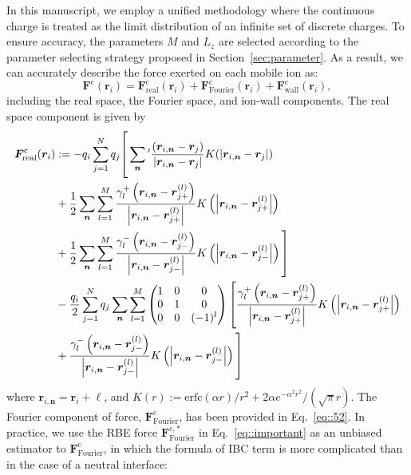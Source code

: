 In this manuscript, we employ a unified methodology where the continuous charge is treated as the limit distribution of an infinite set of discrete charges.
To ensure accuracy, the parameters $M$ and $L_z$ are selected according to the parameter selecting strategy proposed in Section~\ref{sec:parameter}.
As a result, we can accurately describe the force exerted on each mobile ion as:
\begin{equation}
\bm{F}^{\text{c}}(\bm{r}_i)=\bm{F}^{\text{c}}_{\text{real}}(\bm{r}_i)+\bm{F}^{\text{c}}_{\text{Fourier}}(\bm{r}_i)+\bm{F}^{\text{c}}_{\text{wall}}(\bm{r}_i),
\end{equation}
including the real space, the Fourier space, and ion-wall components. The real space component is given by
\begin{equation}\label{eq::F_real_detail}
\begin{split}
\bm{F}_{\text{real}}^{\te{c}}(\bm{r}_i)
& := -q_i\sum_{j=1}^{N} q_j \Biggg[\sum_{\bm{n}}{}^\prime \frac{\left(\bm{r}_{i,\bm{n}} - \bm{r}_{j}\right)}{\abs{\bm{r}_{i,\bm{n}} - \bm{r}_{j}}} K(\abs{\bm{r}_{i,\bm{n}} - \bm{r}_{j}}) \\
&+ \frac{1}{2} \sum_{\bm{n}} \sum_{l=1}^{M} \frac{\gamma_{l}^+\left(\bm{r}_{i,\bm{n}}-\bm{r}_{j+}^{(l)}\right)}{\left|\bm{r}_{i,\bm{n}}-\bm{r}_{j+}^{(l)}\right|} K\left(\left|\bm{r}_{i,\bm{n}}-\bm{r}_{j+}^{(l)}\right|\right)\\
&+\frac{1}{2}\sum_{\bm{n}}\sum_{l=1}^{M}\frac{\gamma_{l}^-\left(\bm{r}_{i,\bm{n}}-\bm{r}_{j-}^{(l)}\right)}{\left|\bm{r}_{i,\bm{n}}-\bm{r}_{j-}^{(l)}\right|}K\left(\left|\bm{r}_{i,\bm{n}}-\bm{r}_{j-}^{(l)}\right|\right)\Biggg]\\
&-\frac{q_i}{2}\sum_{j=1}^{N}q_j\sum_{\bm{n}}\sum_{l=1}^{M}\begin{pmatrix}
1&0&0\\
0&1&0\\
0&0&(-1)^l
\end{pmatrix}\Biggg[
\frac{\gamma_{l}^+\left(\bm{r}_{i,\bm{n}}-\bm{r}_{j+}^{(l)}\right)}{\left|\bm{r}_{i,\bm{n}}-\bm{r}_{j+}^{(l)}\right|}K\left(\left|\bm{r}_{i,\bm{n}}-\bm{r}_{j+}^{(l)}\right|\right)\\
&+\frac{\gamma_{l}^-\left(\bm{r}_{i,\bm{n}}-\bm{r}_{j-}^{(l)}\right)}{\left|\bm{r}_{i,\bm{n}}-\bm{r}_{j-}^{(l)}\right|}K\left(\left|\bm{r}_{i,\bm{n}}-\bm{r}_{j-}^{(l)}\right|\right)\Biggg]
\end{split}
\end{equation}
where $\bm{r}_{i,\bm{n}}=\bm{r}_{i}+\bm{\ell}$, and $K(r):=\text{erfc}(\alpha r)/r^2+2\alpha e^{-\alpha^2r^2}/(\sqrt{\pi}r)$. The Fourier component of force, $\bm{F}^{\text{c}}_{\text{Fourier}}$, has been provided in Eq.~\eqref{eq::52}. In practice, we use the RBE force $\bm{F}^{\text{c},*}_{\text{Fourier}}$ in Eq.~\eqref{eq::important} as an unbiased estimator to $\bm{F}^{\text{c}}_{\text{Fourier}}$, in which the formula of IBC term is more complicated than  {in} the case of  {a} neutral interface:
